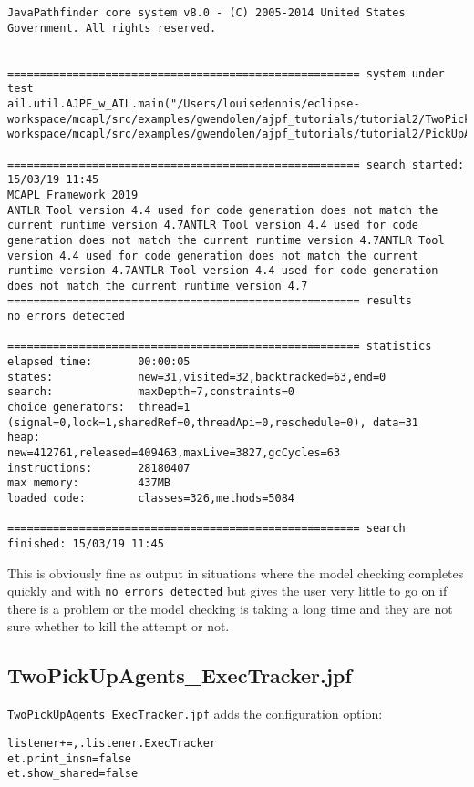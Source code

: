 \begin{verbatim}
JavaPathfinder core system v8.0 - (C) 2005-2014 United States Government. All rights reserved.


====================================================== system under test
ail.util.AJPF_w_AIL.main("/Users/louisedennis/eclipse-workspace/mcapl/src/examples/gwendolen/ajpf_tutorials/tutorial2/TwoPickUpAgents.ail","/Users/louisedennis/eclipse-workspace/mcapl/src/examples/gwendolen/ajpf_tutorials/tutorial2/PickUpAgent.psl","1")

====================================================== search started: 15/03/19 11:45
MCAPL Framework 2019
ANTLR Tool version 4.4 used for code generation does not match the current runtime version 4.7ANTLR Tool version 4.4 used for code generation does not match the current runtime version 4.7ANTLR Tool version 4.4 used for code generation does not match the current runtime version 4.7ANTLR Tool version 4.4 used for code generation does not match the current runtime version 4.7
====================================================== results
no errors detected

====================================================== statistics
elapsed time:       00:00:05
states:             new=31,visited=32,backtracked=63,end=0
search:             maxDepth=7,constraints=0
choice generators:  thread=1 (signal=0,lock=1,sharedRef=0,threadApi=0,reschedule=0), data=31
heap:               new=412761,released=409463,maxLive=3827,gcCycles=63
instructions:       28180407
max memory:         437MB
loaded code:        classes=326,methods=5084

====================================================== search finished: 15/03/19 11:45
\end{verbatim}

This is obviously fine as output in situations where the model checking completes quickly and with \texttt{no errors detected} but gives the user very little to go on if there is a problem or the model checking is taking a long time and they are not sure whether to kill the attempt or not.

\subsection{TwoPickUpAgents\_ExecTracker.jpf}

\texttt{TwoPickUpAgents\_ExecTracker.jpf} adds the configuration option:

\begin{verbatim}
listener+=,.listener.ExecTracker
et.print_insn=false
et.show_shared=false
\end{verbatim}

